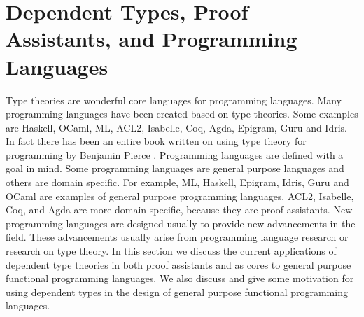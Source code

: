 \chapter{Dependent Types, Proof Assistants, and Programming Languages}
\label{chap:the_design_of_programming_languages}
Type theories are wonderful core languages for programming languages.
Many programming languages have been created based on type
theories. Some examples are Haskell, OCaml, ML, ACL2, Isabelle, Coq,
Agda, Epigram, Guru and Idris.  In fact there has been an entire book
written on using type theory for programming by Benjamin Pierce
\cite{Pierce:2002}.  Programming languages are defined with a goal in
mind.  Some programming languages are general purpose languages and
others are domain specific.  For example, ML, Haskell, Epigram, Idris,
Guru and OCaml are examples of general purpose programming
languages. ACL2, Isabelle, Coq, and Agda are more domain
specific, because they are proof assistants. New programming languages
are designed usually to provide new advancements in the field.  These
advancements usually arise from programming language research or
research on type theory.  In this section we discuss the current
applications of dependent type theories in both proof assistants and
as cores to general purpose functional programming languages.  We also
discuss and give some motivation for using dependent types in the
design of general purpose functional programming languages.

